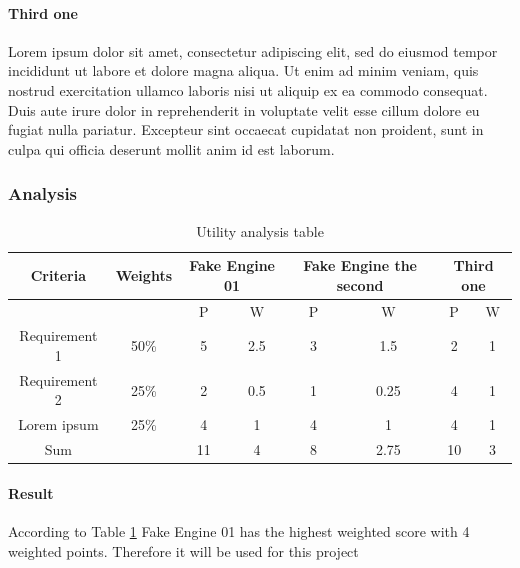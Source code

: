 \documentclass[10pt,a4paper]{article}
\begin{document}
\paragraph{Third one}
Lorem ipsum dolor sit amet, consectetur adipiscing elit, sed do eiusmod tempor incididunt ut labore et dolore magna aliqua. Ut enim ad minim veniam, quis nostrud exercitation ullamco laboris nisi ut aliquip ex ea commodo consequat. Duis aute irure dolor in reprehenderit in voluptate velit esse cillum dolore eu fugiat nulla pariatur. Excepteur sint occaecat cupidatat non proident, sunt in culpa qui officia deserunt mollit anim id est laborum.

\subsubsection{Analysis}
\begin{table}[ht]
\centering
\begin{tabular}{|c|c|c|c|c|c|c|c|}
\hline
Criteria & Weights & \multicolumn{2}{m{2cm}|}{Fake Engine 01} 
&  \multicolumn{2}{m{2cm}|}{Fake Engine the second}
& \multicolumn{2}{m{2cm}|}{Third one}\\
\hline
              &      & P & W   & P & W    & P & W\\
Requirement 1 & 50\% & 5 & 2.5 & 3 & 1.5  & 2 & 1 \\
Requirement 2 & 25\% & 2 & 0.5 & 1 & 0.25 & 4 & 1 \\
Lorem ipsum   & 25\% & 4 & 1   & 4 & 1    & 4 & 1\\
\hline
Sum           &      &11 & 4   & 8 & 2.75 & 10& 3\\
\hline
\end{tabular}
\caption{Utility analysis table}
\label{table:u_a}
\end{table}

\paragraph{Result}
According to Table \ref{table:u_a} Fake Engine 01 has the highest weighted score with 4 weighted points. Therefore it will be used for this project
\end{document}
